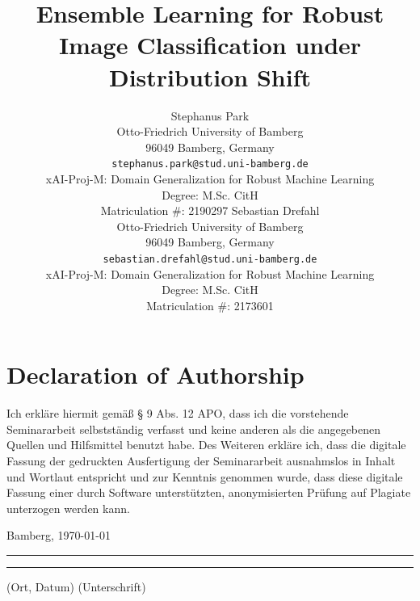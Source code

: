 \documentclass[a4paper]{article}
\title{Ensemble Learning for Robust Image Classification under Distribution Shift}
\author{%
  Stephanus Park \\
  Otto-Friedrich University of Bamberg\\
  96049 Bamberg, Germany\\
  \texttt{stephanus.park@stud.uni-bamberg.de} \\[0.5cm]
  xAI-Proj-M: Domain Generalization for Robust Machine Learning \\
  Degree: M.Sc. CitH \\
  Matriculation \#: 2190297
  \And
  Sebastian Drefahl \\
  Otto-Friedrich University of Bamberg\\
  96049 Bamberg, Germany\\
  \texttt{sebastian.drefahl@stud.uni-bamberg.de} \\[0.5cm]
  xAI-Proj-M: Domain Generalization for Robust Machine Learning \\
  Degree: M.Sc. CitH \\
  Matriculation \#: 2173601
}
\begin{document}
\maketitle
\def\va{{\bm{a}}}




\newpage


\newpage


{\parindent 0cm
\section*{Declaration of Authorship}
Ich erkläre hiermit gemäß § 9 Abs. 12 APO, dass ich die vorstehende Seminararbeit selbstständig verfasst und keine anderen als die angegebenen Quellen und Hilfsmittel benutzt habe. Des Weiteren erkläre ich, dass die digitale Fassung der gedruckten Ausfertigung der Seminararbeit ausnahmslos in Inhalt und Wortlaut entspricht und zur Kenntnis genommen wurde, dass diese digitale Fassung einer durch Software unterstützten, anonymisierten Prüfung auf Plagiate unterzogen werden kann.\\
\vspace{2\baselineskip}
  
Bamberg, \today

\rule[0.5em]{14em}{0.5pt} \hspace{0.25\linewidth}\rule[0.5em]{14em}{0.5pt}
\vspace{1em}
\hspace{4em} (Ort, Datum) \hspace{0.51\linewidth} (Unterschrift)
}









\newpage

\appendix

\end{document}
